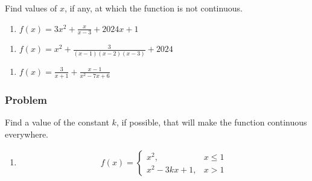 \documentclass[
  letterpaper,
  DIV=11,
  numbers=noendperiod]{scrartcl}
\providecommand{\tightlist}{%
  \setlength{\itemsep}{0pt}\setlength{\parskip}{0pt}}\usepackage{longtable,booktabs,array}
\begin{document}
Find values of \(x\), if any, at which the function is not continuous.

\begin{enumerate}
\def\labelenumi{\alph{enumi}.}
\tightlist
\item
  \(f(x) = 3x^2 + \frac{x}{x-3} + 2024x +1\)
\end{enumerate}

\hfill\break
\hfill\break
\hfill\break
\hfill\break
\hfill\break

\thispagestyle{empty}

\begin{enumerate}
\def\labelenumi{\alph{enumi}.}
\setcounter{enumi}{1}
\tightlist
\item
  \(f(x) = x^2 + \frac{3}{(x - 1)(x-2)(x-3)} + 2024\)
\end{enumerate}

\hfill\break
\hfill\break
\hfill\break
\hfill\break
\hfill\break

\begin{enumerate}
\def\labelenumi{\alph{enumi}.}
\setcounter{enumi}{2}
\tightlist
\item
  \(f(x) = \frac{3}{x + 1} + \frac{x-1}{x^2 - 7x + 6}\)
\end{enumerate}

\hfill\break
\hfill\break
\hfill\break
\hfill\break
\hfill\break

\subsubsection{Problem}\label{problem-2}

Find a value of the constant \(k\), if possible, that will make the
function continuous everywhere.

\begin{enumerate}
\def\labelenumi{\alph{enumi}.}
\tightlist
\item
  \begin{align*}
  f(x) =
   \left\{\begin{array}{lr}
     x^2, & x \le 1 \\
     x^2 - 3kx+1, & x > 1  
  \end{array}\right.
  \end{align*}
\end{enumerate}

\hfill\break
\hfill\break
\hfill\break
\hfill\break

\hfill\break
\hfill\break
\hfill\break
\hfill\break

\thispagestyle{empty}
\end{document}
